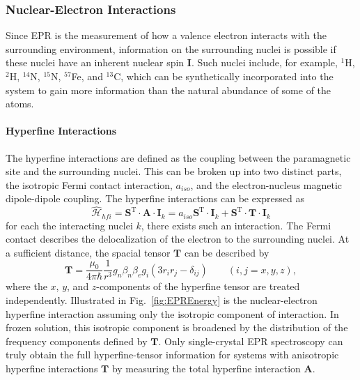 \subsubsection*{Nuclear-Electron Interactions}
Since EPR is the measurement of how a valence electron interacts with the surrounding environment, information on the surrounding nuclei is possible if these nuclei have an inherent nuclear spin $\mathbf{I}$. Such nuclei include, for example, $^1$H, $^2$H, $^{14}$N, $^{15}$N, $^{57}$Fe, and $^{13}$C, which can be synthetically incorporated into the system to gain more information than the natural abundance of some of the atoms. \cite{Doorslaer2007,Harmer2009,CUTSAIL20151370}

\paragraph*{Hyperfine Interactions}
The hyperfine interactions are defined as the coupling between the paramagnetic site and the surrounding nuclei. This can be broken up into two distinct parts, the isotropic Fermi contact interaction, $a_{iso}$, and the electron-nucleus magnetic dipole-dipole coupling. The hyperfine interactions can be expressed as
\begin{equation}
    \hat{\mathcal{H}}_{hfi} = \mathbf{S}^{\text{T}} \cdot \mathbf{A} \cdot \mathbf{I}_k = a_{iso}\mathbf{S}^{\text{T}} \cdot \mathbf{I}_k + \mathbf{S}^{\text{T}} \cdot \mathbf{T} \cdot \mathbf{I}_k \label{eq-2:hfi}
\end{equation}
for each the interacting nuclei $k$, there exists such an interaction. The Fermi contact describes the delocalization of the electron to the surrounding nuclei. At a sufficient distance, the spacial tensor $\mathbf{T}$ can be described by
\begin{equation}
    \mathbf{T} = \frac{\mu_0}{4 \pi \hbar}\frac{1}{r^3} g_n \beta_n \beta_e g_i (3r_i r_j - \delta_{ij}) \qquad (i,j = x,y,z), \label{eq-2:hfiT}
\end{equation}
where the $x$, $y$, and $z$-components of the hyperfine tensor are treated independently. Illustrated in Fig.~\ref{fig:EPREnergy} is the nuclear-electron hyperfine interaction assuming only the isotropic component of interaction. In frozen solution, this isotropic component is broadened by the distribution of the frequency components defined by $\mathbf{T}$. Only single-crystal EPR spectroscopy can truly obtain the full hyperfine-tensor information for systems with anisotropic hyperfine interactions $\mathbf{T}$ by measuring the total hyperfine interaction $\mathbf{A}$.

